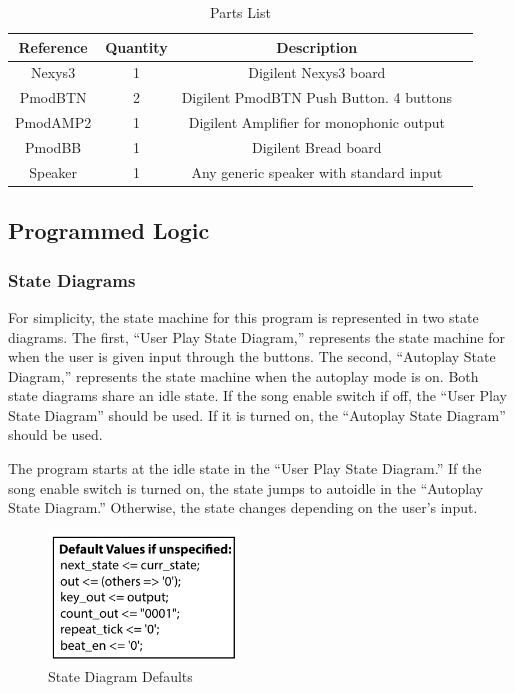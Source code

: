 \documentclass{article}
\begin{document}
		\begin{table}[H]
	  	\caption{Parts List}
	    \centering
	    \begin{tabular}{c c c c}
	    \hline\hline
	    Reference & Quantity & Description \\ [0.5ex] %
	    \hline
	    Nexys3 & 1 & Digilent Nexys3 board \\
	    PmodBTN & 2 & Digilent PmodBTN Push Button. 4 buttons \\
	    PmodAMP2 & 1 & Digilent Amplifier for monophonic output \\
	    PmodBB & 1 & Digilent Bread board \\
	    Speaker & 1 & Any generic speaker with standard input \\
	    \hline
	    \end{tabular}
	    \end{table}

    \newpage
	\subsection{Programmed Logic}

	    \subsubsection{State Diagrams}

		    
		    \begin{multicols}{2}
	    		For simplicity, the state machine for this program is represented in two state diagrams. The first, ``User Play State Diagram,'' represents the state machine for when the user is given input through the buttons. The second, ``Autoplay State Diagram,'' represents the state machine when the autoplay mode is on. Both state diagrams share an idle state. If the song enable switch if off, the ``User Play State Diagram'' should be used. If it is turned on, the ``Autoplay State Diagram'' should be used.

	    		The program starts at the idle state in the ``User Play State Diagram.'' If the song enable switch is turned on, the state jumps to autoidle in the ``Autoplay State Diagram.'' Otherwise, the state changes depending on the user's input.

		    \columnbreak
			    \begin{figure}[H]
			      \centering
			      \includegraphics[width=2in]{img/StateDiagramDefaults}
			      \caption{State Diagram Defaults}
			    \end{figure}
		    \end{multicols}
\end{document}
